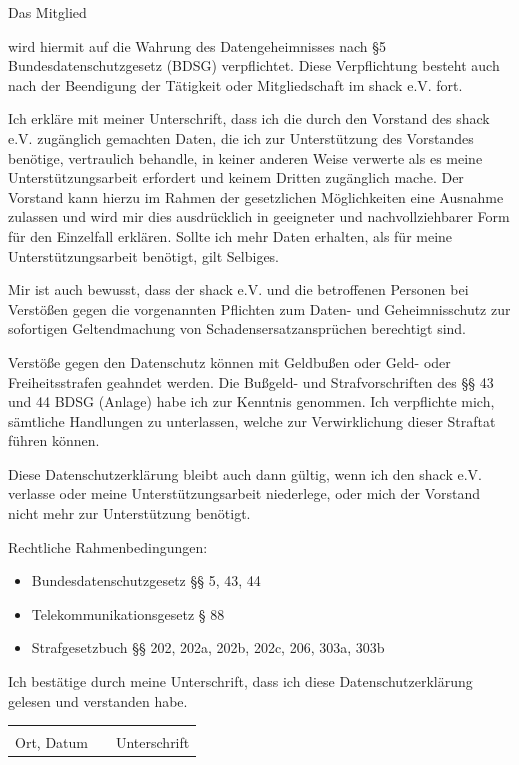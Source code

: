 \documentclass[a4paper]{dinbrief}
\date{\ }
\begin{document}

\begin{letter}{
	}

\subject{}
\opening{}
Das Mitglied 

wird hiermit auf die Wahrung des Datengeheimnisses nach §5 Bundesdatenschutzgesetz (BDSG) verpflichtet.
Diese Verpflichtung besteht auch nach der Beendigung der Tätigkeit oder Mitgliedschaft im shack e.V. fort.

Ich erkläre mit meiner Unterschrift, dass ich die durch den Vorstand des shack e.V. zugänglich gemachten Daten, die ich zur Unterstützung des Vorstandes benötige, vertraulich behandle, in keiner anderen Weise verwerte als es meine Unterstützungsarbeit erfordert und keinem Dritten zugänglich mache. Der Vorstand kann hierzu im Rahmen der gesetzlichen Möglichkeiten eine Ausnahme zulassen und wird mir dies ausdrücklich in geeigneter und nachvollziehbarer Form für den Einzelfall erklären. Sollte ich mehr Daten erhalten, als für meine Unterstützungsarbeit benötigt, gilt Selbiges.

Mir ist auch bewusst, dass der shack e.V. und die betroffenen Personen bei Verstößen gegen die vorgenannten Pflichten zum Daten- und Geheimnisschutz zur sofortigen Geltendmachung von Schadensersatzansprüchen berechtigt sind.

Verstöße gegen den Datenschutz können mit Geldbußen oder Geld- oder Freiheitsstrafen geahndet werden. Die Bußgeld- und Strafvorschriften des §§ 43 und 44 BDSG (Anlage) habe ich zur Kenntnis genommen. Ich verpflichte mich, sämtliche Handlungen zu unterlassen, welche zur Verwirklichung dieser Straftat führen können. 

Diese Datenschutzerklärung bleibt auch dann gültig, wenn ich den shack e.V. verlasse oder meine Unterstützungsarbeit niederlege, oder mich der Vorstand nicht mehr zur Unterstützung benötigt.

Rechtliche Rahmenbedingungen:
\begin{itemize}
	\item Bundesdatenschutzgesetz §§ 5, 43, 44
	\item Telekommunikationsgesetz § 88
	\item Strafgesetzbuch §§ 202, 202a, 202b, 202c, 206, 303a, 303b
\end{itemize}


Ich bestätige durch meine Unterschrift, dass ich diese Datenschutzerklärung gelesen und verstanden habe.

\vfill

\begin{tabular}{lp{2em}l}
	 \hspace{5cm}   && \hspace{5cm} \\\cline{1-1}\cline{3-3}
	 Ort, Datum     && Unterschrift
\end{tabular}

\closing{}
\end{letter}
\end{document}
